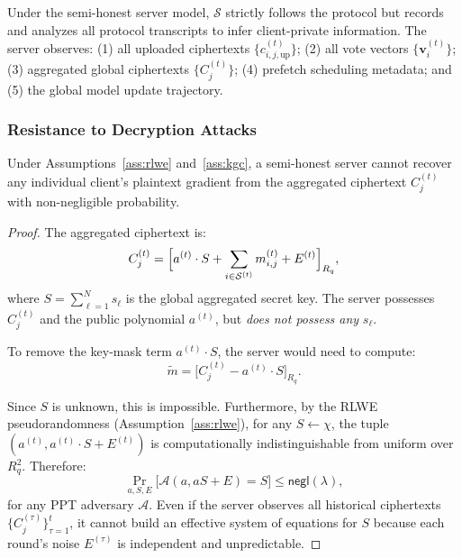 Under the semi-honest server model, $\mathcal{S}$ strictly follows the protocol but records and analyzes all protocol transcripts to infer client-private information. The server observes: (1) all uploaded ciphertexts $\{c_{i,j,\mathrm{up}}^{(t)}\}$; (2) all vote vectors $\{\mathbf{v}_i^{(t)}\}$; (3) aggregated global ciphertexts $\{C_j^{(t)}\}$; (4) prefetch scheduling metadata; and (5) the global model update trajectory.

\subsubsection{Resistance to Decryption Attacks}

\begin{theorem}
\label{thm:server-decrypt}
Under Assumptions~\ref{ass:rlwe} and~\ref{ass:kgc}, a semi-honest server cannot recover any individual client's plaintext gradient from the aggregated ciphertext $C_j^{(t)}$ with non-negligible probability.
\end{theorem}

\begin{proof}
The aggregated ciphertext is:
\begin{equation}
    C_j^{(t)} = \Bigl[ a^{(t)} \cdot S + \sum_{i \in \mathcal{S}^{(t)}} m_{i,j}^{(t)} + E^{(t)} \Bigr]_{R_q},
\end{equation}
where $S = \sum_{\ell=1}^{N} s_\ell$ is the global aggregated secret key. The server possesses $C_j^{(t)}$ and the public polynomial $a^{(t)}$, but \emph{does not possess any} $s_\ell$.

To remove the key-mask term $a^{(t)} \cdot S$, the server would need to compute:
\begin{equation}
    \tilde{m} = \bigl[ C_j^{(t)} - a^{(t)} \cdot S \bigr]_{R_q}.
\end{equation}

Since $S$ is unknown, this is impossible. Furthermore, by the RLWE pseudorandomness (Assumption~\ref{ass:rlwe}), for any $S \gets \chi$, the tuple $(a^{(t)}, a^{(t)} \cdot S + E^{(t)})$ is computationally indistinguishable from uniform over $R_q^2$. Therefore:
\begin{equation}
    \Pr_{a,S,E}\bigl[\mathcal{A}(a, aS+E) = S\bigr] \leq \mathsf{negl}(\lambda),
\end{equation}
for any PPT adversary $\mathcal{A}$. Even if the server observes all historical ciphertexts $\{C_j^{(\tau)}\}_{\tau=1}^{t}$, it cannot build an effective system of equations for $S$ because each round's noise $E^{(\tau)}$ is independent and unpredictable.
\end{proof}

